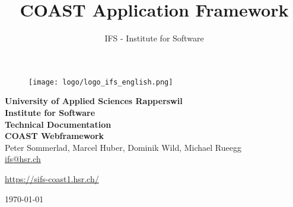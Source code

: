 \documentclass[11pt,a4paper,oneside]{scrreprt}
\title{COAST Application Framework}
\author{IFS - Institute for Software}
\begin{document}
\begin{titlepage}

\thispagestyle{empty}

\begin{center}
\begin{figure}[h]
 \centering
 \texttt{[image: logo/logo\_ifs\_english.png]}
\end{figure}
\vspace{1,5cm}
{\Large \bfseries University of Applied Sciences Rapperswil\\}
\vspace{0,5cm}
{\Large \bfseries Institute for Software\\}
\vspace{2cm}
\sffamily
{\Huge \bfseries Technical Documentation}\\
\vspace{0.5cm}
{\Huge \bfseries COAST Webframework}\\
\vspace{1,5cm}
Peter Sommerlad, Marcel Huber, Dominik Wild, Michael Rueegg\\\url{ifs@hsr.ch}\\\vspace{1,0cm}
\begin{scriptsize}\url{https://sifs-coast1.hsr.ch/}\\\end{scriptsize}
\vspace{2,5cm}
\vspace{0,3cm}
\today
\end{center}
\end{titlepage}

\setcounter{tocdepth}{2}

\tableofcontents
\newpage
{}
\pagestyle{scrheadings}


%

\appendix

\cleardoublepage
{}
\listoffigures

\cleardoublepage
{}
\printnomenclature


\cleardoublepage
{}

\end{document}
